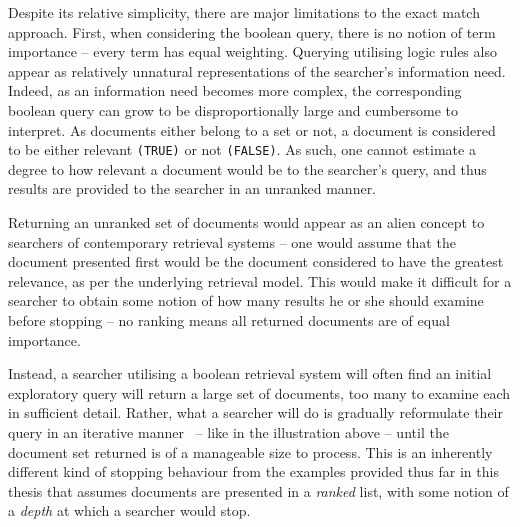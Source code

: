 Despite its relative simplicity, there are major limitations to the exact match approach. First, when considering the boolean query, there is no notion of term importance -- every term has equal weighting. Querying utilising logic rules also appear as relatively unnatural representations of the searcher's information need. Indeed, as an information need becomes more complex, the corresponding boolean query can grow to be disproportionally large and cumbersome to interpret. As documents either belong to a set or not, a document is considered to be either relevant \texttt{(TRUE)} or not \texttt{(FALSE)}. As such, one cannot estimate a degree to how relevant a document would be to the searcher's query, and thus results are provided to the searcher in an unranked manner.

Returning an unranked set of documents would appear as an alien concept to searchers of contemporary retrieval systems -- one would assume that the document presented first would be the document considered to have the greatest relevance, as per the underlying retrieval model. This would make it difficult for a searcher to obtain some notion of how many results he or she should examine before stopping -- no ranking means all returned documents are of equal importance. 

\begin{figure}[h]
    \centering
    \vspace{4mm}
    \label{fig:searchbox}
    \vspace{-5mm}
\end{figure}

Instead, a searcher utilising a boolean retrieval system will often find an initial exploratory query will return a large set of documents, too many to examine each in sufficient detail. Rather, what a searcher will do is gradually reformulate their query in an iterative manner~\citep{koch2009iterative} -- like in the illustration above -- until the document set returned is of a manageable size to process. This is an inherently different kind of stopping behaviour from the examples provided thus far in this thesis that assumes documents are presented in a \emph{ranked} list, with some notion of a \emph{depth} at which a searcher would stop.

